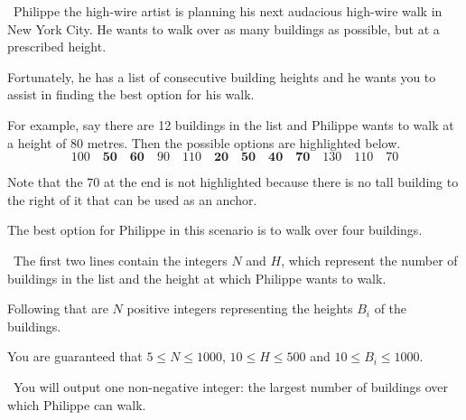

\Question\ Philippe the high-wire artist is planning his next audacious high-wire walk in
New York City. He wants to walk over as many buildings as possible, but at a prescribed
height.

Fortunately, he has a list of consecutive building heights and he wants you to assist in
finding the best option for his walk.

For example, say there are 12 buildings in the list and Philippe wants to walk at a height
of 80 metres. Then the possible options are highlighted below.\[
  100 \quad
  \mathbf{50} \quad \mathbf{60} \quad
  90 \quad 110 \quad
  \mathbf{20} \quad \mathbf{50} \quad \mathbf{40} \quad \mathbf{70} \quad
  130 \quad 110 \quad 70
\]

Note that the 70 at the end is not highlighted because there is no tall building to the
right of it that can be used as an anchor.

The best option for Philippe in this scenario is to walk over four buildings.

\Input\ The first two lines contain the integers $N$ and $H$, which represent the number
of buildings in the list and the height at which Philippe wants to walk.

Following that are $N$ positive integers representing the heights $B_i$ of the buildings.

You are guaranteed that $5 \le N \le 1000$, $10 \le H \le 500$ and $10 \le B_i \le 1000$.

\Output\ You will output one non-negative integer: the largest number of buildings over
which Philippe can walk.

\Sample



